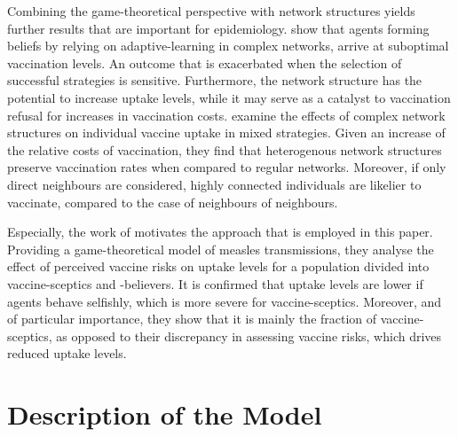 \documentclass[11pt]{article}
\begin{document}
Combining the game-theoretical perspective with network structures yields further results that are important for epidemiology.   
\cite{fu2010} show that agents forming beliefs by relying on adaptive-learning in complex networks, arrive at suboptimal vaccination levels. An outcome that is exacerbated when the selection of successful strategies is sensitive. Furthermore, the network structure has the potential to increase uptake levels, while it may serve as a catalyst to vaccination refusal for increases in vaccination costs.  
\cite{shi2017} examine the effects of complex network structures on individual vaccine uptake in mixed strategies. Given an increase of the relative costs of vaccination, they find that heterogenous network structures preserve vaccination rates when compared to regular networks. Moreover, if only direct neighbours are considered, highly connected individuals are likelier to vaccinate, compared to the case of neighbours of neighbours. 

Especially, the work of \cite{shim2012} motivates the approach that is employed in this paper. Providing a game-theoretical model of measles transmissions, they analyse the effect of perceived vaccine risks on uptake levels for a population divided into vaccine-sceptics and -believers. It is confirmed that uptake levels are lower if agents behave selfishly, which is more severe for vaccine-sceptics. Moreover, and of particular importance, they show that it is mainly the fraction of vaccine-sceptics, as opposed to their discrepancy in assessing vaccine risks, which drives reduced uptake levels. 


\section{Description of the Model}
\end{document}
